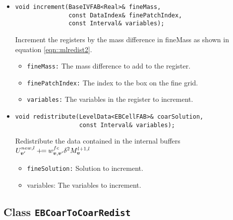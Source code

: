 \begin{itemize}
\item \begin{small}\begin{verbatim}
void increment(BaseIVFAB<Real>& fineMass,
               const DataIndex& finePatchIndex,
               const Interval& variables);
\end{verbatim}\end{small}
Increment the registers by the mass difference
in fineMass as shown in equation \ref{eqn::mlredist2}.
\begin{itemize}
\item \verb/fineMass:/  The mass difference to add to the register.
\item \verb/finePatchIndex:/ The index to the box on the fine grid. 
\item \verb/variables:/ The variables in the register to increment.
\end{itemize}

\item \begin{small}\begin{verbatim}
void redistribute(LevelData<EBCellFAB>& coarSolution,
                  const Interval& variables);
\end{verbatim}\end{small}
Redistribute the data contained in the internal buffers
$U^{new,l}_{{\boldsymbol{v}}'} \mathbin{+\mkern-7mu=} w^{fc}_{{\boldsymbol{v}},{\boldsymbol{v}}'}
\delta^2 M^{l+1, l}_{\boldsymbol{v}} $
\begin{itemize}
\item {\tt fineSolution:} Solution to increment.
\item {variables:}  The variables to increment. 
\end{itemize}
\end{itemize}

\subsection{Class {\tt EBCoarToCoarRedist}}


